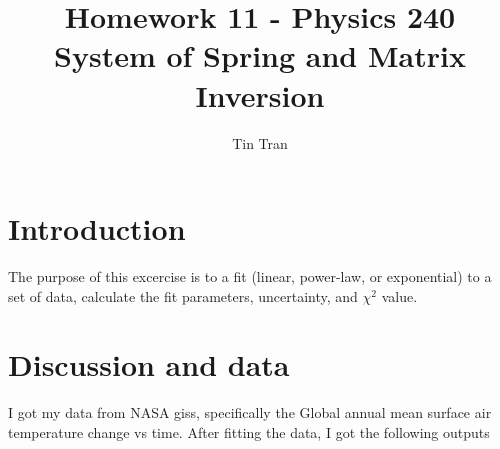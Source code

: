 \documentclass{article}
\begin{document}
\title{Homework 11 - Physics 240\\
		System of Spring and Matrix Inversion}
\author{Tin Tran}

\maketitle

\section{Introduction}
The purpose of this excercise is to a fit (linear, power-law, or exponential) to a set of data, calculate the fit parameters, uncertainty, and $\chi ^2$ value. 
\section{Discussion and data}
I got my data from NASA giss, specifically the Global annual mean surface air temperature change vs time. After fitting the data, I got the following outputs
\end{document}
